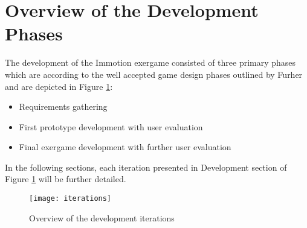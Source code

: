 \section{Overview of the Development Phases}
The development of the Immotion exergame consisted of three primary phases which are according to the well accepted game design phases outlined by Furher and are depicted in Figure \ref{fig:iterations}: 
\begin{itemize}
\item Requirements gathering 
\item First prototype development with user evaluation
\item Final exergame development with further user evaluation
\end{itemize}
In the following sections, each iteration presented in Development section of Figure \ref{fig:iterations} will be further detailed. 

\begin{figure}[h]
    \centering
    \texttt{[image: iterations]}
    \caption{Overview of the development iterations}
    \label{fig:iterations}
\end{figure}
